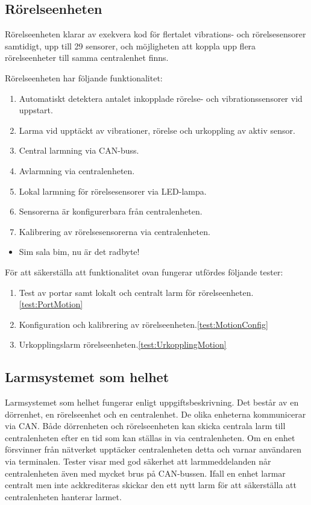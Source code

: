 \documentclass{article}
\begin{document}
 \subsection{Rörelseenheten}
Rörelseenheten klarar av  exekvera kod för flertalet vibrations- och rörelsesensorer samtidigt, upp till 29 sensorer,
och möjligheten att koppla upp flera rörelseenheter till samma centralenhet finns.

 Rörelseenheten har följande funktionalitet:
 \begin{enumerate}
 	\item Automatiskt detektera antalet inkopplade rörelse- och vibrationssensorer vid uppstart.
	\item Larma vid upptäckt av vibrationer, rörelse och urkoppling av aktiv sensor.
    	\item Central larmning via CAN-buss.
	\item Avlarmning via centralenheten.
	\item Lokal larmning för rörelsesensorer via LED-lampa.
	\item Sensorerna är konfigurerbara från centralenheten.
	\item Kalibrering av rörelsesensorerna via centralenheten.
 \end{enumerate}

 \begin{itemize}
\color{white}
\item Sim sala bim, nu är det radbyte!
\end{itemize}

 För att säkerställa att funktionalitet ovan fungerar utfördes följande tester:
 \begin{enumerate}
	\item Test av portar samt lokalt och centralt larm för rörelseenheten.\ref{test:PortMotion}
	\item Konfiguration och kalibrering av rörelseenheten.\ref{test:MotionConfig}
	\item Urkopplingslarm rörelseenheten.\ref{test:UrkopplingMotion}
 \end{enumerate}

 \subsection{Larmsystemet som helhet}
 Larmsystemet som helhet fungerar enligt uppgiftsbeskrivning. Det består av
 en dörrenhet, en rörelseenhet och en centralenhet. De olika enheterna kommunicerar via CAN. Både dörrenheten och rörelseenheten kan skicka centrala larm till centralenheten efter en tid som kan ställas in via centralenheten. Om en enhet försvinner från nätverket upptäcker centralenheten detta och varnar användaren via terminalen. Tester visar med god säkerhet att larmmeddelanden når centralenheten även med mycket brus på CAN-bussen.
 Ifall en enhet larmar centralt men inte ackkrediteras skickar den ett nytt larm för att säkerställa att centralenheten hanterar larmet.
\end{document}
